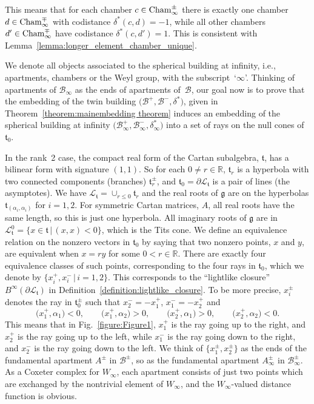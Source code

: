 \documentclass[pdftex]{sigma}
\numberwithin{equation}{section}
\def\R{\mathbb{R}}
\def\a{\alpha}
\def\cB{\mathcal B}
\def\cL{\mathcal L}
\def\fg{\mathfrak{g}}
\def\ft{\mathfrak{t}}
\begin{document}
This means that for each chamber $c\in {\rm Cham}_\infty^\pm$ there is exactly one chamber $d\in {\rm Cham}_\infty^\mp$
with codistance $\delta^*(c,d)= -1$, while all other chambers $d'\in {\rm Cham}_\infty^\mp$ have codistance $\delta^*(c,d') = 1$. This is consistent with Lemma~\ref{lemma:longer_element_chamber_unique}.

We denote all objects associated to the spherical building at infinity, i.e., apartments, chambers or the Weyl group, with the subscript~`$\infty$'. Thinking of apartments of $\cB_\infty$ as the ends of apartments of~$\cB$, our goal now is to prove that the embedding of the twin building $\big(\cB^+, \cB^-, \delta^*\big)$, given in Theorem~\ref{theorem:mainembedding theorem} induces an embedding of the spherical building at infinity $\big(\cB^+_\infty, \cB^-_\infty, \delta^*_\infty\big)$ into a set of rays on the null cones of $\ft_0$.

In the rank~2 case, the compact real form of the Cartan subalgebra, $\ft$,
has a bilinear form with signature $(1,1)$. So for each $0\neq r\in\R$, $\ft_r$ is a hyperbola with two connected components (branches) $\ft_r^\pm$, and $\ft_0 = \partial\cL_\ft$ is a pair of lines (the asymptotes). We have $\cL_\ft = \cup_{r\leq 0} \ft_r$ and the real roots of
$\fg$ are on the hyperbolas $\ft_{(\a_i,\a_i)}$ for $i=1,2$. For symmetric Cartan matrices, $A$, all real roots have the same length, so
this is just one hyperbola. All imaginary roots of $\fg$ are in $\cL_\ft^0 = \{x\in\ft\, |\, (x,x)<0\}$, which is the Tits cone. We define an
equivalence relation on the nonzero vectors in $\ft_0$ by saying that two nonzero points, $x$ and $y$, are equivalent when $x = ry$ for
some $0<r\in\R$. There are exactly four equivalence classes of such points, corresponding to the four rays in $\ft_0$, which we denote
by $\big\{x_i^+, x_i^-\, |\, i=1,2\big\}$. This corresponds to the ``lightlike closure'' $B^\infty(\partial\cL_\ft)$ in Definition~\ref{definition:lightlike_closure}.
To be more precise,
$x_i^\pm$ denotes the ray in $\ft_0^\pm$ such that $x_2^- = - x_1^+$, $x_1^- = - x_2^+$ and
\[\big(x_1^+,\a_1\big) < 0,\qquad \big(x_1^+,\a_2\big) > 0,\qquad \big(x_2^+,\a_1\big) > 0,\qquad \big(x_2^+,\a_2\big) < 0.\]
This means that in Fig.~\ref{figure:Figure1}, $x_1^+$ is the ray going up to the right,
and $x_2^+$ is the ray going up to the left, while $x_1^-$ is the ray going down to the right, and $x_2^-$ is the ray going down to the left. We think of $\big\{x_1^\pm, x_2^\pm\big\}$ as the ends of the fundamental apartment $A^\pm$ in $\cB^\pm$, so as the fundamental apartment $A^\pm_\infty$ in $\cB^\pm_\infty$. As a Coxeter complex for $W_\infty$, each apartment consists of just two points which are exchanged by the nontrivial element of $W_\infty$, and the $W_\infty$-valued distance function is obvious.
\end{document}
